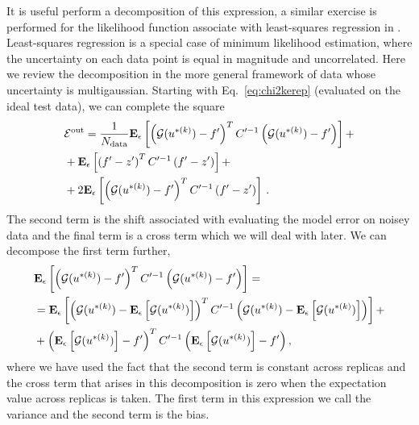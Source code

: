 It is useful perform a decomposition of this expression, a similar exercise is
performed for the likelihood function associate with least-squares regression in
\cite{mlforphysics}. Least-squares regression is a special case of minimum
likelihood estimation, where the uncertainty on each data point is equal in
magnitude and uncorrelated. Here we review the decomposition in the more general
framework of data whose uncertainty is multigaussian. Starting with
Eq.~\ref{eq:chi2kerep} (evaluated on the ideal test data), we can complete the
square
\begin{equation}
    \begin{split}
        &\mathcal{E}^{\rm out} = \frac{1}{N_{\rm data}} \mathbf{E}_{\epsilon}\left[ 
            \left( \mathcal{G}(u^{* (k)}) - f^\prime \right)^T
            C^{\prime -1}
            \left( \mathcal{G}(u^{* (k)}) - f^\prime \right)
         \right] + \\
        &+ \mathbf{E}_{\epsilon}\left[ 
            \left( f^\prime - z^\prime \right)^T
            C^{\prime -1}
            \left( f^\prime - z^\prime \right)
         \right]+ \\
        &+ 2 \mathbf{E}_{\epsilon}\left[ 
            \left( \mathcal{G}(u^{* (k)}) - f^\prime \right)^T
            C^{\prime -1}
            \left(f^\prime - z^\prime \right)
         \right]\, .
    \end{split}
\end{equation}
The second term is the shift associated with evaluating the model error on
noisey data and the final term is a cross term which we will deal with later. We
can decompose the first term further,
\begin{equation}
    \begin{split}
        &\mathbf{E}_{\epsilon}\left[ 
            \left( \mathcal{G}(u^{* (k)}) - f^\prime \right)^T
            C^{\prime -1}
            \left( \mathcal{G}(u^{* (k)}) - f^\prime \right)
         \right] = \\
        &= \mathbf{E}_{\epsilon}\left[ 
            \left( \mathcal{G}(u^{* (k)}) - \mathbf{E}_{\epsilon}\left[ \mathcal{G}(u^{* (k)}) \right] \right)^T
            C^{\prime -1}
            \left( \mathcal{G}(u^{* (k)}) - \mathbf{E}_{\epsilon}\left[ \mathcal{G}(u^{* (k)}) \right] \right)
         \right] + \\
        &+ \left( \mathbf{E}_{\epsilon}\left[ \mathcal{G}(u^{* (k)}) \right] - f^\prime \right)^T
        C^{\prime -1}
        \left( \mathbf{E}_{\epsilon}\left[ \mathcal{G}(u^{* (k)}) \right] - f^\prime \right),
    \end{split}
\end{equation}
where we have used the fact that the second term is constant across replicas and
the cross term that arises in this decomposition is zero when the expectation
value across replicas is taken. The first term in this expression we call the
variance and the second term is the bias.

